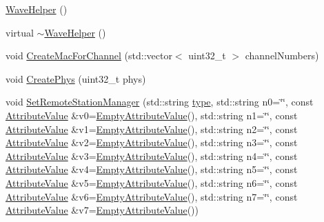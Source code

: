 \begin{DoxyCompactItemize}
\item 
\hyperlink{classns3_1_1WaveHelper_a60d11c15ce049a1ee39a9791df844e63}{Wave\+Helper} ()
\item 
virtual \hyperlink{classns3_1_1WaveHelper_a13bffa885c49186b9b769fd527b69e98}{$\sim$\+Wave\+Helper} ()
\item 
void \hyperlink{classns3_1_1WaveHelper_a5b8cefd9b90d0568e310423c80d7bb12}{Create\+Mac\+For\+Channel} (std\+::vector$<$ uint32\+\_\+t $>$ channel\+Numbers)
\item 
void \hyperlink{classns3_1_1WaveHelper_ade3e11bb39ee3530c48aabff5a4e352c}{Create\+Phys} (uint32\+\_\+t phys)
\item 
void \hyperlink{classns3_1_1WaveHelper_adab4d73cf2f36e24d9861f9aef1ffe01}{Set\+Remote\+Station\+Manager} (std\+::string \hyperlink{visualizer-ideas_8txt_add98db9e15e2a58cf2b57623e7aa893a}{type}, std\+::string n0=\char`\"{}\char`\"{}, const \hyperlink{classns3_1_1AttributeValue}{Attribute\+Value} \&v0=\hyperlink{classns3_1_1EmptyAttributeValue}{Empty\+Attribute\+Value}(), std\+::string n1=\char`\"{}\char`\"{}, const \hyperlink{classns3_1_1AttributeValue}{Attribute\+Value} \&v1=\hyperlink{classns3_1_1EmptyAttributeValue}{Empty\+Attribute\+Value}(), std\+::string n2=\char`\"{}\char`\"{}, const \hyperlink{classns3_1_1AttributeValue}{Attribute\+Value} \&v2=\hyperlink{classns3_1_1EmptyAttributeValue}{Empty\+Attribute\+Value}(), std\+::string n3=\char`\"{}\char`\"{}, const \hyperlink{classns3_1_1AttributeValue}{Attribute\+Value} \&v3=\hyperlink{classns3_1_1EmptyAttributeValue}{Empty\+Attribute\+Value}(), std\+::string n4=\char`\"{}\char`\"{}, const \hyperlink{classns3_1_1AttributeValue}{Attribute\+Value} \&v4=\hyperlink{classns3_1_1EmptyAttributeValue}{Empty\+Attribute\+Value}(), std\+::string n5=\char`\"{}\char`\"{}, const \hyperlink{classns3_1_1AttributeValue}{Attribute\+Value} \&v5=\hyperlink{classns3_1_1EmptyAttributeValue}{Empty\+Attribute\+Value}(), std\+::string n6=\char`\"{}\char`\"{}, const \hyperlink{classns3_1_1AttributeValue}{Attribute\+Value} \&v6=\hyperlink{classns3_1_1EmptyAttributeValue}{Empty\+Attribute\+Value}(), std\+::string n7=\char`\"{}\char`\"{}, const \hyperlink{classns3_1_1AttributeValue}{Attribute\+Value} \&v7=\hyperlink{classns3_1_1EmptyAttributeValue}{Empty\+Attribute\+Value}())
\item 

\end{DoxyCompactItemize}
